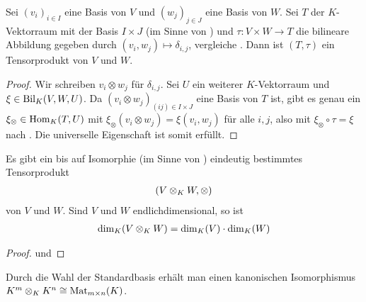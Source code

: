 \begin{lemma}
	Sei $(v_i)_{i\in I}$ eine Basis von $V$ und $(w_j)_{j\in J}$ eine Basis von $W$. Sei $T$ der $K$-Vektorraum mit der Basis $I\times J$ (im Sinne von ) und $\tau:V\times W\to T$ die bilineare Abbildung gegeben durch $(v_i,w_j)\mapsto \delta_{i,j}$, vergleiche . Dann ist $(T,\tau)$ ein Tensorprodukt von $V$ und $W$.
\end{lemma}
\begin{proof}
	Wir schreiben $v_i\otimes w_j$ für $\delta_{i,j}$. Sei $U$ ein weiterer $K$-Vektorraum und $\xi\in\operatorname{Bil}_K(V,W,U)$. Da $(v_i\otimes w_j)_{(ij)\in I\times J}$ eine Basis von $T$ ist, gibt es genau ein $\xi_\otimes\in\operatorname{Hom}_K(T,U)$ mit $\xi_\otimes(v_i\otimes w_j)=\xi(v_i,w_j)$ für alle $i,j$, also mit $\xi_\otimes\circ\tau=\xi$ nach . Die universelle Eigenschaft ist somit erfüllt.
\end{proof}

\begin{proposition}
	Es gibt ein bis auf Isomorphie (im Sinne von ) eindeutig bestimmtes Tensorprodukt
	\begin{align}
		(V\otimes_K W,\otimes)\notag
	\end{align}
	von $V$ und $W$. Sind $V$ und $W$ endlichdimensional, so ist
	\begin{align}
		\dim_K(V\otimes_K W)=\dim_K(V)\cdot\dim_K(W)\notag
	\end{align}
\end{proposition}
\begin{proof}
	 und 
\end{proof}

\begin{example}
	Durch die Wahl der Standardbasis erhält man einen kanonischen Isomorphismus $K^m\otimes_K K^n\cong\operatorname{Mat}_{m\times n}(K)$.
\end{example}